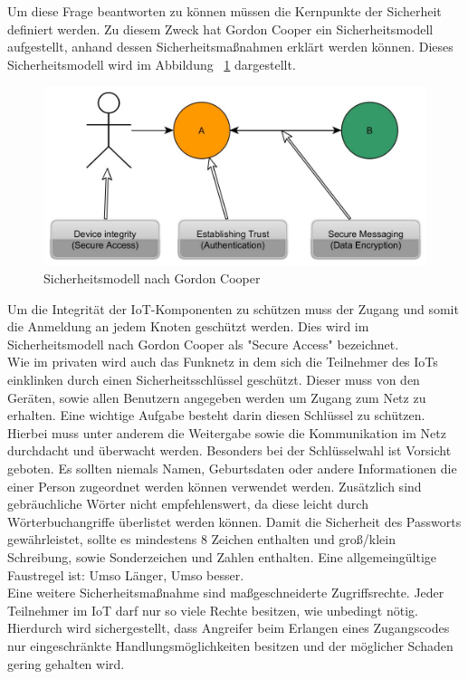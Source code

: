 Um diese Frage beantworten zu können müssen die Kernpunkte der Sicherheit definiert werden. Zu diesem Zweck hat Gordon Cooper ein Sicherheitsmodell aufgestellt, anhand dessen Sicherheitsmaßnahmen erklärt werden können. Dieses Sicherheitsmodell wird im Abbildung ~\ref{f:security} dargestellt.
\vspace{5 mm}
\begin{figure}[H] 
	\centering
	\includegraphics[scale=0.4]{Bilder/sicherheitsmodell}
	\caption{Sicherheitsmodell nach Gordon Cooper\cite{z:DesignElektronik}}
	\label{f:security}
\end{figure}
\vspace{5 mm}
Um die Integrität der \ac{IoT}-Komponenten zu schützen muss der Zugang und somit die Anmeldung an jedem Knoten geschützt werden. Dies wird im Sicherheitsmodell nach Gordon Cooper als "Secure Access" bezeichnet.\\
Wie im privaten wird auch das Funknetz in dem sich die Teilnehmer des \ac{IoT}s einklinken durch einen Sicherheitsschlüssel geschützt. Dieser muss von den Geräten, sowie allen Benutzern angegeben werden um Zugang zum Netz zu erhalten. Eine wichtige Aufgabe besteht darin diesen Schlüssel zu schützen. Hierbei muss unter anderem die Weitergabe sowie die Kommunikation im Netz durchdacht und überwacht werden. Besonders bei der Schlüsselwahl ist Vorsicht geboten. Es sollten niemals Namen, Geburtsdaten oder andere Informationen die einer Person zugeordnet werden können verwendet werden. Zusätzlich sind gebräuchliche Wörter nicht empfehlenswert, da diese leicht durch Wörterbuchangriffe überlistet werden können. Damit die Sicherheit des Passworts gewährleistet, sollte es mindestens 8 Zeichen enthalten und groß/klein Schreibung, sowie Sonderzeichen und Zahlen enthalten. Eine allgemeingültige Faustregel ist: Umso Länger, Umso besser.\\

Eine weitere Sicherheitsmaßnahme sind maßgeschneiderte Zugriffsrechte. Jeder Teilnehmer im \ac{IoT} darf nur so viele Rechte besitzen, wie unbedingt nötig. Hierdurch wird sichergestellt, dass Angreifer beim Erlangen eines Zugangscodes nur eingeschränkte Handlungsmöglichkeiten besitzen und der möglicher Schaden gering gehalten wird.\\

